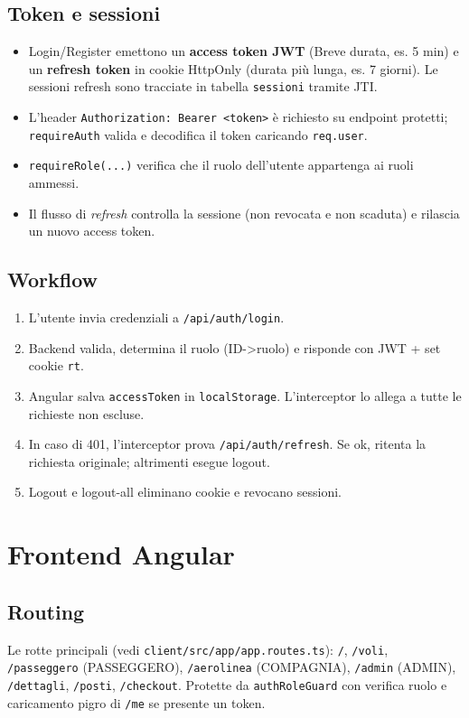 \documentclass[11pt,a4paper]{article}
\begin{document}
\subsection{Token e sessioni}
\begin{itemize}
  \item Login/Register emettono un \textbf{access token JWT} (Breve durata, es. 5 min) e un \textbf{refresh token} in cookie HttpOnly (durata più lunga, es. 7 giorni). Le sessioni refresh sono tracciate in tabella \texttt{sessioni} tramite JTI.
  \item L'header \texttt{Authorization: Bearer <token>} è richiesto su endpoint protetti; \texttt{requireAuth} valida e decodifica il token caricando \texttt{req.user}.
  \item \texttt{requireRole(...)} verifica che il ruolo dell'utente appartenga ai ruoli ammessi.
  \item Il flusso di \emph{refresh} controlla la sessione (non revocata e non scaduta) e rilascia un nuovo access token.
\end{itemize}

\subsection{Workflow}
\begin{enumerate}
  \item L'utente invia credenziali a \texttt{/api/auth/login}.
  \item Backend valida, determina il ruolo (ID->ruolo) e risponde con JWT + set cookie \texttt{rt}.
  \item Angular salva \texttt{accessToken} in \texttt{localStorage}. L'interceptor lo allega a tutte le richieste non escluse.
  \item In caso di 401, l'interceptor prova \texttt{/api/auth/refresh}. Se ok, ritenta la richiesta originale; altrimenti esegue logout.
  \item Logout e logout-all eliminano cookie e revocano sessioni.
\end{enumerate}

\section{Frontend Angular}
\subsection{Routing}
Le rotte principali (vedi \texttt{client/src/app/app.routes.ts}): \texttt{/}, \texttt{/voli}, \texttt{/passeggero} (PASSEGGERO), \texttt{/aerolinea} (COMPAGNIA), \texttt{/admin} (ADMIN), \texttt{/dettagli}, \texttt{/posti}, \texttt{/checkout}. Protette da \texttt{authRoleGuard} con verifica ruolo e caricamento pigro di \texttt{/me} se presente un token.
\end{document}
